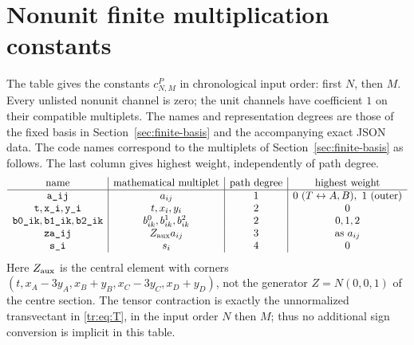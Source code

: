 \section{Nonunit finite multiplication constants}
\label{sec:constant-table}
The table gives the constants $c_{N,M}^{P}$ in chronological input
order: first $N$, then $M$. Every unlisted nonunit channel is zero; the
unit channels have coefficient $1$ on their compatible multiplets. The
names and representation degrees are those of the fixed basis in Section~\ref{sec:finite-basis} and the accompanying
exact JSON data.
The code names correspond to the multiplets of
Section~\ref{sec:finite-basis} as follows. The last column gives highest
weight, independently of path degree.
\[
\begin{array}{c|c|c|c}
\text{name}&\text{mathematical multiplet}&\text{path degree}&\text{highest weight}\\\hline
\texttt{a\_ij}&a_{ij}&1&0\ (T\leftrightarrow A,B),\ 1\ (\text{outer})\\
\texttt{t},\texttt{x\_i},\texttt{y\_i}&t,x_i,y_i&2&0\\
\texttt{b0\_ik},\texttt{b1\_ik},\texttt{b2\_ik}&b^0_{ik},b^1_{ik},b^2_{ik}&2&0,1,2\\
\texttt{za\_ij}&Z_{\rm aux}a_{ij}&3&\text{as }a_{ij}\\
\texttt{s\_i}&s_i&4&0
\end{array}
\]
Here $Z_{\rm aux}$ is the central element with corners
$(t,x_A-3y_A,x_B+y_B,x_C-3y_C,x_D+y_D)$, not the generator
$Z=N(0,0,1)$ of the centre section. The tensor contraction is exactly
the unnormalized transvectant in \eqref{tr:eq:T},
in the input order
$N$ then $M$; thus no additional sign conversion is implicit in this table.

